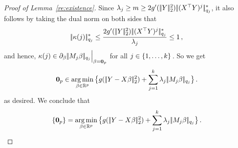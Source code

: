 \documentclass[bj]{imsart}
\newcommand{\normtwo}[1]{\ensuremath{\!|\!| #1 | \! |_{2}}}
\newcommand{\normqj}[1]{\ensuremath{\!|\!| #1 | \! |_{q_j}}}
\newcommand{\normqjd}[1]{\ensuremath{\!|\!| #1 | \! |_{q_j}^*}}
\newcommand{\1}{{\rm 1}\mskip -4,5mu{\rm l} }
\newcommand{\argmin}{\mathop{\mathrm{arg\,min}}}
\def\R{\mathbb{R}}
\begin{document}
\begin{proof}[Proof of Lemma~\ref{re:existence}]
Since  $\lambda_j\ge m\ge 2g'(\,\normtwo{\outcome}^2)\,\normqjd{ (\design^\top \outcome)^j}$, it also follows by taking the dual norm on both sides that
\begin{equation}\label{eq:boundedlambda}
\normqjd{\kappa(j)}\le \frac{2g'(\,\normtwo{\outcome}^2)\,\normqjd{(\design^\top \outcome)^j}}{\lambda_j}\leq 1\,,
\end{equation}
and hence, $\kappa(j)\in\partial_{\beta}\, \normqj{\fusedmatrix_j\beta}\Big|_{\beta=\bold{0}_p}$ for all $j\in\{1,\dots,k\}$\,. So we get
\begin{equation*}
\bold{0}_p\in\argmin_{\beta\in\R^p} \big\{ g(\,\normtwo{\outcome-\design\beta}^2)+\sum_{j=1}^\numbergroups\lambda_j\,\normqj{\fusedmatrix_j\beta}\big\}\,.
\end{equation*}
as desired.
We conclude that 
\begin{equation*}
\{\bold{0}_p\}=\argmin_{\beta\in\R^p} \big\{ g(\,\normtwo{\outcome-\design\beta}^2)+\sum_{j=1}^\numbergroups\lambda_j\,\normqj{\fusedmatrix_j\beta}\big\}\,.
\end{equation*}


\end{proof}
\end{document}
